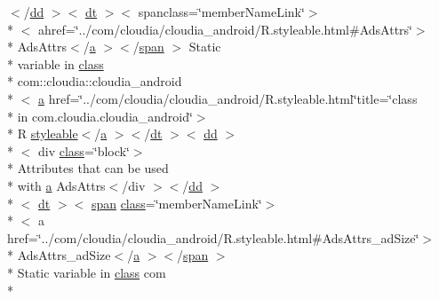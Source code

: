 \begin{DoxyCompactItemize}
\item 
$<$/\hyperlink{stylesheet_8css_a47f4718a86835a7771ec592ece845221}{dd} $>$$<$ \hyperlink{stylesheet_8css_a107565fb4039d33b041380d6e0ea1d80}{dt} $>$$<$ spanclass=\char`\"{}member\-Name\-Link\char`\"{}$>$\\*
$<$ ahref=\char`\"{}../com/cloudia/cloudia\-\_\-android/R.\-styleable.\-html\#Ads\-Attrs\char`\"{}$>$\\*
 Ads\-Attrs$<$/\hyperlink{style_8css_a5e8981582017bb8b84c21f148345d1f7}{a} $>$$<$/\hyperlink{stylesheet_8css_a8343996ebcf16220b04e54659aac31cc}{span} $>$ Static \\*
variable in \hyperlink{_tools_8html_acf06f836132665ba8114f5a414c2403f}{class} \\*
com\-::cloudia\-::cloudia\-\_\-android\\*
$<$ \hyperlink{style_8css_a5e8981582017bb8b84c21f148345d1f7}{a} href=\char`\"{}../com/cloudia/cloudia\-\_\-android/R.\-styleable.\-html\char`\"{}title=\char`\"{}class \\*
in com.\-cloudia.\-cloudia\-\_\-android\char`\"{}$>$\\*
 R \hyperlink{index-17_8html_ae6c9bf1e41380184b4b665ca9ab6ba0a}{styleable}$<$/\hyperlink{style_8css_a5e8981582017bb8b84c21f148345d1f7}{a} $>$$<$/\hyperlink{stylesheet_8css_a107565fb4039d33b041380d6e0ea1d80}{dt} $>$$<$ \hyperlink{stylesheet_8css_a47f4718a86835a7771ec592ece845221}{dd} $>$\\*
$<$ div \hyperlink{_tools_8html_acf06f836132665ba8114f5a414c2403f}{class}=\char`\"{}block\char`\"{}$>$\\*
 Attributes that can be used \\*
with \hyperlink{style_8css_a5e8981582017bb8b84c21f148345d1f7}{a} Ads\-Attrs$<$/div $>$$<$/\hyperlink{stylesheet_8css_a47f4718a86835a7771ec592ece845221}{dd} $>$\\*
$<$ \hyperlink{stylesheet_8css_a107565fb4039d33b041380d6e0ea1d80}{dt} $>$$<$ \hyperlink{stylesheet_8css_a8343996ebcf16220b04e54659aac31cc}{span} \hyperlink{_tools_8html_acf06f836132665ba8114f5a414c2403f}{class}=\char`\"{}member\-Name\-Link\char`\"{}$>$\\*
$<$ a href=\char`\"{}../com/cloudia/cloudia\-\_\-android/R.\-styleable.\-html\#Ads\-Attrs\-\_\-ad\-Size\char`\"{}$>$\\*
 Ads\-Attrs\-\_\-ad\-Size$<$/\hyperlink{style_8css_a5e8981582017bb8b84c21f148345d1f7}{a} $>$$<$/\hyperlink{stylesheet_8css_a8343996ebcf16220b04e54659aac31cc}{span} $>$\\*
 Static variable in \hyperlink{_tools_8html_acf06f836132665ba8114f5a414c2403f}{class} com \\*

\end{DoxyCompactItemize}

